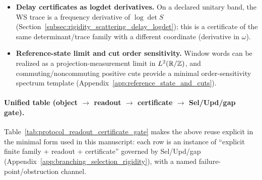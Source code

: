 \begin{itemize}
\item \textbf{Delay certificates as logdet derivatives.} On a declared unitary band, the WS trace is a frequency derivative of $\log\det S$ (Section~\ref{subsec:rigidity_scattering_delay_logdet}); this is a certificate of the same determinant/trace family with a different coordinate (derivative in $\omega$).
\item \textbf{Reference-state limit and cut order sensitivity.} Window words can be realized as a projection-measurement limit in $L^2(\mathbb{R}/\mathbb{Z})$, and commuting/noncommuting positive cuts provide a minimal order-sensitivity spectrum template (Appendix~\ref{app:reference_state_and_cuts}).
\end{itemize}

\paragraph{Unified table (object \texorpdfstring{$\to$}{->} readout \texorpdfstring{$\to$}{->} certificate \texorpdfstring{$\to$}{->} Sel/Upd/gap gate).}
\AuditTag Table~\ref{tab:protocol_readout_certificate_gate} makes the above reuse explicit in the minimal form used in this manuscript:
each row is an instance of ``explicit finite family + readout + certificate'' governed by Sel/Upd/gap (Appendix~\ref{app:branching_selection_rigidity}), with a named failure-point/obstruction channel.

